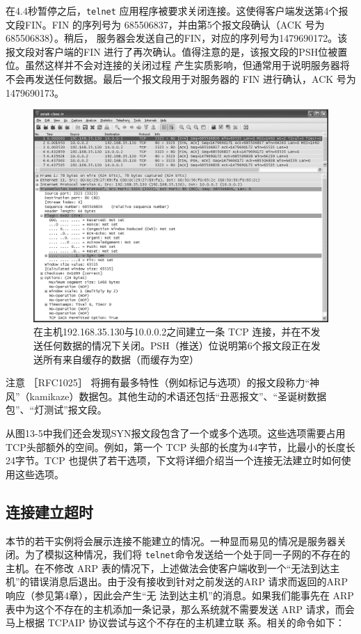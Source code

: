 在4.4秒暂停之后，\verb|telnet| 应用程序被要求关闭连接。这使得客户端发送第4个报文段FIN。FIN 的序列号为 685506837，并由第5个报文段确认（ACK 号为 685506838）。稍后，
服务器会发送自己的FIN，对应的序列号为1479690172。该报文段对客户端的FIN 进行了再次确认。值得注意的是，该报文段的PSH位被置位。虽然这样并不会对连接的关闭过程
产生实质影响，但通常用于说明服务器将不会再发送任何数据。最后一个报文段用于对服务器的 FIN 进行确认，ACK 号为 1479690173。

\begin{figure}[ht]
	\includegraphics[width=1.0\textwidth]{imgs/13/13-5.png}
	\caption{在主机192.168.35.130与10.0.0.2之间建立一条 TCP 连接，并在不发送任何数据的情况下关闭。PSH（推送）位说明第6个报文段正在发送所有来自缓存的数据（而缓存为空）}
\end{figure}

注意 ［RFC1025］ 将拥有最多特性（例如标记与选项）的报文段称力“神风”（kamikaze）数据包。其他生动的术语还包括“丑恶报文”、“圣诞树数据包”、“灯测试”报文段。

从图13-5中我们还会发现SYN报文段包含了一个或多个选项。这些选项需要占用 TCP头部额外的空间。例如，第一个 TCP 头部的长度为44字节，比最小的长度长24字节。TCP
也提供了若干选项，下文将详细介绍当一个连接无法建立时如何使用这些选项。
\subsection{连接建立超时}
本节的若干实例将会展示连接不能建立的情况。一种显而易见的情况是服务器关闭。为了模拟这种情况，我们将 \verb|telnet|命令发送给一个处于同一子网的不存在的主机。在不修改
ARP 表的情况下，上述做法会使客户端收到一个“无法到达主机”的错误消息后退出。由于没有接收到针对之前发送的ARP 请求而返回的ARP 响应（参见第4章），因此会产生“无
法到达主机”的消息。如果我们能事先在 ARP 表中为这个不存在的主机添加一条记录，那么系统就不需要发送 ARP 请求，而会马上根据 TCPAIP 协议尝试与这个不存在的主机建立联
系。相关的命令如下：

